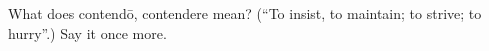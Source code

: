 \begin{tcolorbox}[breakable,colback=teal!4,colframe=teal!35!black,title={Before you move on}]
What does contendō, contendere mean? (\textquotedblleft{}To insist, to maintain; to strive; to hurry\textquotedblright{}.) Say it once more.
\end{tcolorbox}
